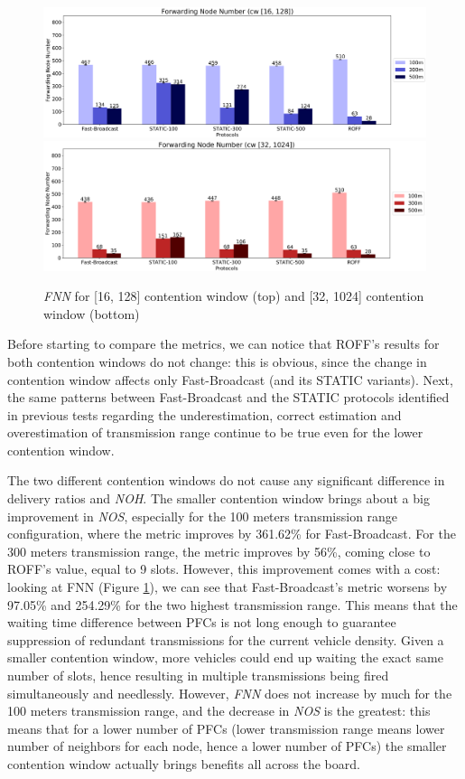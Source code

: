 		\begin{figure}[H]
			\centering
			\includegraphics[width=1.0\textwidth]{immagini/la-25/cw/16/fnn}
			\includegraphics[width=1.0\textwidth]{immagini/la-25/cw/32/fnn}
			\caption{\textit{FNN} for [16, 128] contention window (top) and [32, 1024] contention window (bottom)}
			\label{fig:la-cw-fnn}
		\end{figure}
	
		Before starting to compare the metrics, we can notice that ROFF's results for both contention windows do not change: this is obvious, since the change in contention window affects only Fast-Broadcast (and its STATIC variants). Next, the same patterns between Fast-Broadcast and the STATIC protocols identified in previous tests regarding the underestimation, correct estimation and overestimation of transmission range continue to be true even for the lower contention window.
		
		
		The two different contention windows do not cause any significant difference in delivery ratios and \textit{NOH}. The smaller contention window brings about a big improvement in \textit{NOS}, especially for the 100 meters transmission range configuration, where the metric improves by 361.62\% for Fast-Broadcast. For the 300 meters transmission range, the metric improves by 56\%, coming close to ROFF's value, equal to 9 slots. However, this improvement comes with a cost: looking at FNN (Figure \ref{fig:la-cw-fnn}), we can see that Fast-Broadcast's metric worsens by 97.05\% and 254.29\% for the two highest transmission range. This means that the waiting time difference between PFCs is not long enough to guarantee suppression of redundant transmissions for the current vehicle density. Given a smaller contention window, more vehicles could end up waiting the exact same number of slots, hence resulting in multiple transmissions being fired simultaneously and needlessly. However, \textit{FNN} does not increase by much for the 100 meters transmission range, and the decrease in \textit{NOS} is the greatest: this means that for a lower number of PFCs (lower transmission range means lower number of neighbors for each node, hence a lower number of PFCs) the smaller contention window actually brings benefits all across the board. 
		
